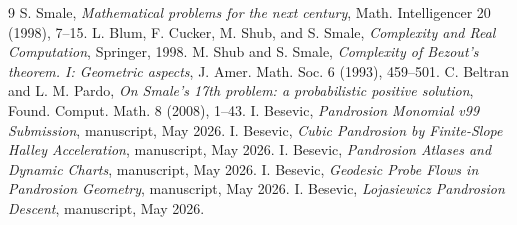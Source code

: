 \documentclass[11pt]{article}
\begin{document}
\begin{thebibliography}{9}
S. Smale, \emph{Mathematical problems for the next century}, Math. Intelligencer 20 (1998), 7--15.
L. Blum, F. Cucker, M. Shub, and S. Smale, \emph{Complexity and Real Computation}, Springer, 1998.
M. Shub and S. Smale, \emph{Complexity of Bezout's theorem. I: Geometric aspects}, J. Amer. Math. Soc. 6 (1993), 459--501.
C. Beltran and L. M. Pardo, \emph{On Smale's 17th problem: a probabilistic positive solution}, Found. Comput. Math. 8 (2008), 1--43.
I. Besevic, \emph{Pandrosion Monomial v99 Submission}, manuscript, May 2026.
I. Besevic, \emph{Cubic Pandrosion by Finite-Slope Halley Acceleration}, manuscript, May 2026.
I. Besevic, \emph{Pandrosion Atlases and Dynamic Charts}, manuscript, May 2026.
I. Besevic, \emph{Geodesic Probe Flows in Pandrosion Geometry}, manuscript, May 2026.
I. Besevic, \emph{Lojasiewicz Pandrosion Descent}, manuscript, May 2026.
\end{thebibliography}
\end{document}
